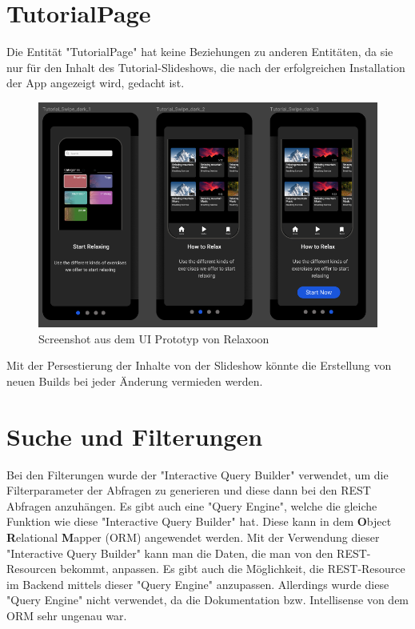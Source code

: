 \section{TutorialPage}
Die Entität "TutorialPage" hat keine Beziehungen zu anderen Entitäten, da sie nur für den Inhalt des Tutorial-Slideshows,
die nach der erfolgreichen Installation der App angezeigt wird, gedacht ist.

\begin{figure}[H]
  \centering
  \includegraphics[height=0.5\textwidth]{./pics/slideshow.png}
  \caption{Screenshot aus dem UI Prototyp von Relaxoon}
\end{figure}

Mit der Persestierung der Inhalte von der Slideshow könnte die Erstellung
von neuen Builds bei jeder Änderung vermieden werden.


\section{Suche und Filterungen}

Bei den Filterungen wurde der "Interactive Query Builder" verwendet,
um die Filterparameter der Abfragen zu generieren
und diese dann bei den REST Abfragen anzuhängen.
Es gibt auch eine "Query Engine", welche die gleiche Funktion wie diese
"Interactive Query Builder" hat.
Diese kann in dem \textbf{O}bject \textbf{R}elational \textbf{M}apper (ORM) angewendet werden.
Mit der Verwendung dieser "Interactive Query Builder" kann man die Daten,
die man von den REST-Resourcen bekommt, anpassen.
Es gibt auch die Möglichkeit, die REST-Resource im Backend mittels dieser
"Query Engine" anzupassen.
Allerdings wurde diese "Query Engine" nicht verwendet,
da die Dokumentation bzw. Intellisense von dem ORM sehr ungenau war.

